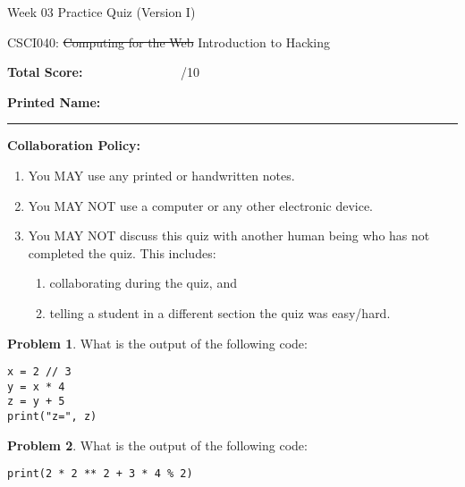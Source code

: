 \documentclass[10pt]{article}
\theoremstyle{definition}
\newtheorem{problem}{Problem}
\begin{document}
\begin{center}
    {
\Large
    Week 03 Practice Quiz (Version I)
}

    \vspace{0.1in}
    CSCI040: \sout{Computing for the Web} Introduction to Hacking

    \vspace{0.1in}
\end{center}

\vspace{0.15in}
\noindent
\textbf{Total Score:} ~~~~~~~~~~~~~~~/10

\vspace{0.5in}
\noindent
\textbf{Printed Name:}

\noindent
\rule{\textwidth}{0.1pt}
\vspace{0.25in}

\noindent
\textbf{Collaboration Policy:}
\begin{enumerate}
    \item You MAY use any printed or handwritten notes.
    \item You MAY NOT use a computer or any other electronic device.
    \item You MAY NOT discuss this quiz with another human being who has not completed the quiz.
        This includes:
        \begin{enumerate}
            \item collaborating during the quiz, and
            \item telling a student in a different section the quiz was easy/hard.
        \end{enumerate}
\end{enumerate}

\vspace{0.15in}

\begin{problem}
    What is the output of the following code:
\end{problem}
\begin{lstlisting}
x = 2 // 3
y = x * 4
z = y + 5
print("z=", z)
\end{lstlisting}
\vspace{1.5in}

\begin{problem}
    What is the output of the following code:
\end{problem}
\begin{lstlisting}
print(2 * 2 ** 2 + 3 * 4 % 2)
\end{lstlisting}
\vspace{1.5in}
\end{document}
